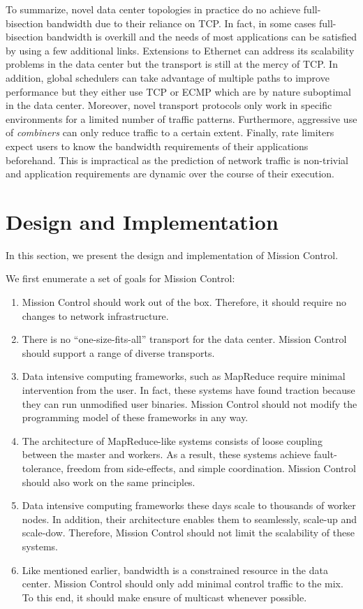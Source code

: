 \documentclass[a4paper,12pt,twoside,openright]{report}
\begin{document}
To summarize, novel data center topologies in practice do no achieve
full-bisection bandwidth due to their reliance on TCP. In fact, in some cases
full-bisection bandwidth is overkill and the needs of most applications can be
satisfied by using a few additional links. Extensions to Ethernet can address
its scalability problems in the data center but the transport is still at the
mercy of TCP. In addition, global schedulers can take advantage of multiple
paths to improve performance but they either use TCP or ECMP which are by nature
suboptimal in the data center. Moreover, novel transport protocols only work in
specific environments for a limited number of traffic patterns. Furthermore,
aggressive use of \emph{combiners} can only reduce traffic to a certain extent.
Finally, rate limiters expect users to know the bandwidth requirements of their
applications beforehand. This is impractical as the prediction of network
traffic is non-trivial and application requirements are dynamic over the course
of their execution.

\chapter{Design and Implementation}\label{chapter:designImplementation}
In this section, we present the design and implementation of Mission Control.

We first enumerate a set of goals for Mission Control:
\begin{enumerate}
  \item Mission Control should work out of the box. Therefore, it should require
  no changes to network infrastructure.
  \item There is no ``one-size-fits-all'' transport for the data center.
  Mission Control should support a range of diverse transports.
  \item Data intensive computing frameworks, such as MapReduce require minimal
  intervention from the user. In fact, these systems have found traction because
  they can run unmodified user binaries. Mission Control should not modify the
  programming model of these frameworks in any way.
  \item The architecture of MapReduce-like systems consists of loose coupling
  between the master and workers. As a result, these systems achieve
  fault-tolerance, freedom from side-effects, and simple coordination. Mission
  Control should also work on the same principles.
  \item Data intensive computing frameworks these days scale to thousands of
  worker nodes. In addition, their architecture enables them to seamlessly,
  scale-up and scale-dow. Therefore, Mission Control should not limit the
  scalability of these systems.
  \item Like mentioned earlier, bandwidth is a constrained resource in the data
  center. Mission Control should only add minimal control traffic to the mix. To
  this end, it should make ensure of multicast whenever possible.
\end{enumerate}
\end{document}
